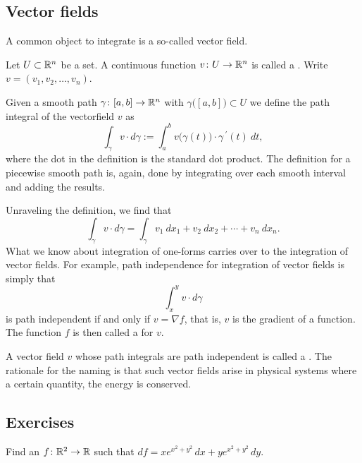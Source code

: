 \subsection{Vector fields}

A common object to integrate is a so-called vector field.

\begin{defn}
Let $U \subset {\mathbb{R}}^n$ be a set.
A continuous function $v \colon U \to {\mathbb{R}}^n$ is called a
\emph{}.  Write $v = (v_1,v_2,\ldots,v_n)$.

Given a smooth path $\gamma \colon [a,b] \to {\mathbb{R}}^n$ with
$\gamma\bigl([a,b]\bigr) \subset U$ we define
the path integral of the vectorfield $v$ as
\begin{equation*}
\int_{\gamma} v \cdot d\gamma
:=
\int_a^b v\bigl(\gamma(t)\bigr) \cdot \gamma^{\:\prime}(t) ~ dt ,
\end{equation*}
where the dot in the definition is the standard dot product.
The definition for a piecewise smooth path is, again, done by integrating over
each smooth interval and adding the results.
\end{defn}

Unraveling the definition, we find that
\begin{equation*}
\int_{\gamma} v \cdot d\gamma
=
\int_{\gamma} v_1 ~dx_1 + v_2 ~dx_2 + \cdots + v_n ~dx_n .
\end{equation*}
What we know about integration of
one-forms carries over to the integration of vector fields.
For example, path independence for integration of vector fields is simply
that
\begin{equation*}
\int_x^y v \cdot d\gamma
\end{equation*}
is path independent if and only if 
$v = \nabla f$, that is, $v$ is the gradient of a function.  The function $f$
is then called a \emph{} for $v$.

A vector field $v$ whose path integrals are path independent is called
a \emph{}.  The rationale for the naming
is that such vector fields arise in physical systems
where a certain quantity, the energy is conserved.

\subsection{Exercises}

\begin{exercise}
Find an $f \colon {\mathbb{R}}^2 \to {\mathbb{R}}$ such that $df = xe^{x^2+y^2}\, dx +
ye^{x^2+y^2} \, dy$.
\end{exercise}

